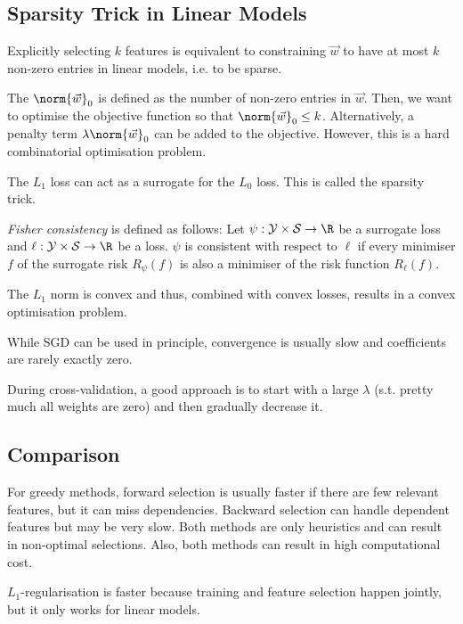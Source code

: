 \subsection{Sparsity Trick in Linear Models}
Explicitly selecting $k$ features is equivalent to constraining
$\vec{w}$ to have at most $k$ non-zero entries in linear models,
i.e. to be sparse.

The $\norm{\vec{w}}_0$ is defined as the number of non-zero
entries in $\vec{w}$.
Then, we want to optimise the objective function so that
$\norm{\vec{w}}_0 \leq k$.
Alternatively, a penalty term $\lambda \norm{\vec{w}}_0$
can be added to the objective.
However, this is a hard combinatorial optimisation problem.

The $L_1$ loss can act as a surrogate for the $L_0$ loss.
This is called the sparsity trick.

\emph{Fisher consistency} is defined as follows:
Let $\psi : \mathcal{Y} \times \mathcal{S} \to \R$
be a surrogate loss and
$\ell : \mathcal{Y} \times \mathcal{S} \to \R$
be a loss.
$\psi$ is consistent with respect to $\ell$
if every minimiser $f$ of the surrogate risk
$R_\psi(f)$ is also a minimiser of the
risk function $R_\ell(f)$.

The $L_1$ norm is convex and thus,
combined with convex losses,
results in a convex optimisation problem.

While SGD can be used in principle,
convergence is usually slow and coefficients
are rarely exactly zero.

During cross-validation, a good approach is to start with
a large $\lambda$ (s.t. pretty much all weights are zero)
and then gradually decrease it.


\subsection{Comparison}
For greedy methods,
forward selection is usually faster if there are few relevant
features, but it can miss dependencies.
Backward selection can handle dependent features but may be
very slow.
Both methods are only heuristics and can result in non-optimal
selections.
Also, both methods can result in high computational cost.

$L_1$-regularisation is faster because training and feature
selection happen jointly,
but it only works for linear models.
